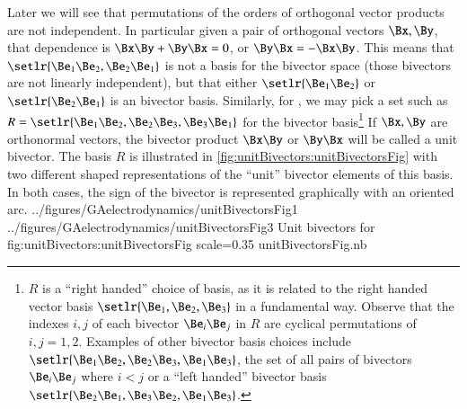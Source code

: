 Later we will see that permutations of the orders of orthogonal vector products are not independent.
In particular
given a pair of orthogonal vectors \( \Bx, \By \), that dependence is
\(\Bx \By + \By \Bx = 0 \),
or \( \By \Bx = - \Bx \By \).  This means that \( \setlr{ \Be_1 \Be_2, \Be_2 \Be_1 } \) is not a basis for the  bivector space (those bivectors are not linearly independent), but that either \( \setlr{ \Be_1 \Be_2 } \) or \( \setlr{ \Be_2 \Be_1 } \) is an  bivector basis.
Similarly, for , we may pick a set such as \( R = \setlr{ \Be_1 \Be_2, \Be_2 \Be_3, \Be_3 \Be_1 } \) for the bivector basis\footnote{\(R\) is a ``right handed'' choice of basis, as it is related to the right handed vector basis \( \setlr{ \Be_1, \Be_2, \Be_3 } \) in a fundamental way.  Observe that the indexes \( i, j \) of each bivector \( \Be_i \Be_j \) in \( R \) are cyclical permutations of \( i,j = 1,2 \).  Examples of other bivector basis choices include \( \setlr{ \Be_1 \Be_2, \Be_2 \Be_3, \Be_1 \Be_3 } \), the set of all pairs of bivectors \( \Be_i \Be_j \) where \( i < j \) or a ``left handed'' bivector basis
\( \setlr{ \Be_2 \Be_1, \Be_3 \Be_2, \Be_1 \Be_3 } \).}
If \( \Bx, \By \) are orthonormal vectors, the bivector product \( \Bx \By \) or \( \By \Bx \) will be called a unit bivector.
The basis \( R \) is illustrated in
\cref{fig:unitBivectors:unitBivectorsFig} with two different shaped representations of the ``unit'' bivector elements of this basis.
In both cases, the sign of the bivector is represented graphically with an oriented arc.
\mathImageTwoFigures
{../figures/GAelectrodynamics/unitBivectorsFig1}
{../figures/GAelectrodynamics/unitBivectorsFig3}
{Unit bivectors for }
{fig:unitBivectors:unitBivectorsFig}
{scale=0.35}
{unitBivectorsFig.nb}

